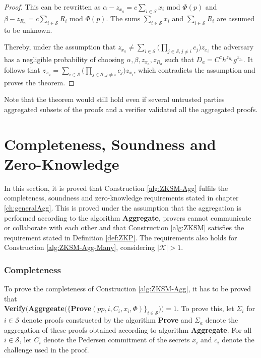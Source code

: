 \begin{proof}
This can be rewritten as $\alpha-z_{x_a} =  c \sum_{i\in\mathcal{S}} x_i$ mod $\Phi(p)$ and  $\beta-z_{R_a} =  c \sum_{i\in\mathcal{S}} R_i$ mod $\Phi(p)$. The sums $ \sum_{i\in\mathcal{S}} x_i$ and $ \sum_{i\in\mathcal{S}} R_i$ are assumed to be unknown.  

Thereby, under the assumption that $z_{x_a}\neq \sum_{i\in\mathcal{S}} \Big( \prod_{j\in\mathcal{S}, j\neq i} c_j \big) z_{x_i} $ the adversary has a negligible probability of choosing $\alpha,\beta,z_{x_a},z_{R_a}$ such that $D_a= C^ch^{z_{R_a}}g^{z_{x_a}}$. It follows that  $z_{x_a} = \sum_{i\in\mathcal{S}} \Big( \prod_{j\in\mathcal{S}, j\neq i} c_j \big) z_{x_i}$, which contradicts the assumption and proves the theorem. 


\end{proof}
Note that the theorem would still hold even if several untrusted parties aggregated subsets of the proofs and a verifier validated all the aggregated proofs. 

\section{Completeness, Soundness and Zero-Knowledge}
\label{sec:CSZKAgg}
In this section, it is proved that Construction \ref{alg:ZKSM-Agg}  fulfils the completeness, soundness and zero-knowledge requirements stated in chapter \ref{ch:generalAgg}. This is proved under the  assumption that the aggregation is performed according to the algorithm \textbf{Aggregate},  provers cannot communicate or collaborate with each other and that Construction \ref{alg:ZKSM} satisfies the requirement stated in Definition \ref{def:ZKP}.
 The requirements also holds for Construction \ref{alg:ZKSM-Agg-Many}, considering $|\mathcal{K}|>1$.

\subsubsection*{Completeness}
To prove the completeness of Construction \ref{alg:ZKSM-Agg}, it has to be proved that\\ \textbf{Verify}$ ( $\textbf{Aggrgeate}$ (\{ $\textbf{Prove}$ (pp,i,C_i,x_i,\Phi)\}_{i\in\mathcal{S}}) )= 1$. To prove this, let $\Sigma_i$ for $i\in\mathcal{S}$ denote proofs constructed by the algorithm \textbf{Prove} and $\Sigma_a $ denote the aggregation of these proofs obtained according to algorithm \textbf{Aggregate}. For all $i\in\mathcal{S}$, let $C_i$ denote the Pedersen commitment of the secrets $x_i$ and $c_i$ denote the challenge used in the proof.

